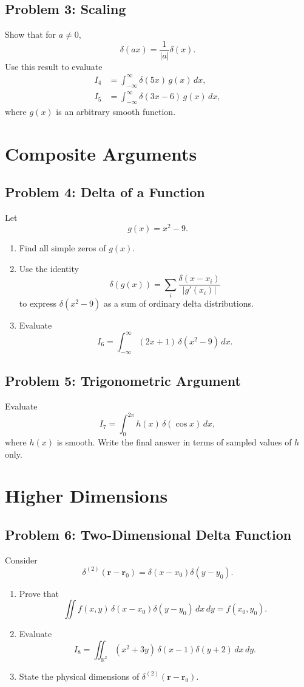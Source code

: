 \documentclass[hidelinks]{article}
\begin{document}
\subsection{Problem 3: Scaling}
Show that for $a\neq 0$,
\[
\delta(ax)=\frac{1}{|a|}\delta(x).
\]
Use this result to evaluate
\begin{align*}
I_4 &= \int_{-\infty}^{\infty} \delta(5x)\,g(x)\,dx,\\
I_5 &= \int_{-\infty}^{\infty} \delta(3x-6)\,g(x)\,dx,
\end{align*}
where $g(x)$ is an arbitrary smooth function.

\section{Composite Arguments}

\subsection{Problem 4: Delta of a Function}
Let
\[
g(x)=x^2-9.
\]
\begin{enumerate}[label=\alph*)]
\item Find all simple zeros of $g(x)$.
\item Use the identity
\[
\delta(g(x))=\sum_i \frac{\delta(x-x_i)}{|g'(x_i)|}
\]
to express $\delta(x^2-9)$ as a sum of ordinary delta distributions.
\item Evaluate
\[
I_6=\int_{-\infty}^{\infty} (2x+1)\,\delta(x^2-9)\,dx.
\]
\end{enumerate}

\subsection{Problem 5: Trigonometric Argument}
Evaluate
\[
I_7=\int_{0}^{2\pi} h(x)\,\delta(\cos x)\,dx,
\]
where $h(x)$ is smooth. Write the final answer in terms of sampled values of $h$ only.

\section{Higher Dimensions}

\subsection{Problem 6: Two-Dimensional Delta Function}
Consider
\[
\delta^{(2)}(\mathbf{r}-\mathbf{r}_0)=\delta(x-x_0)\delta(y-y_0).
\]
\begin{enumerate}[label=\alph*)]
\item Prove that
\[
\iint f(x,y)\,\delta(x-x_0)\delta(y-y_0)\,dx\,dy=f(x_0,y_0).
\]
\item Evaluate
\[
I_8=\iint_{\mathbb{R}^2} (x^2+3y)\,\delta(x-1)\delta(y+2)\,dx\,dy.
\]
\item State the physical dimensions of $\delta^{(2)}(\mathbf{r}-\mathbf{r}_0)$.
\end{enumerate}
\end{document}
